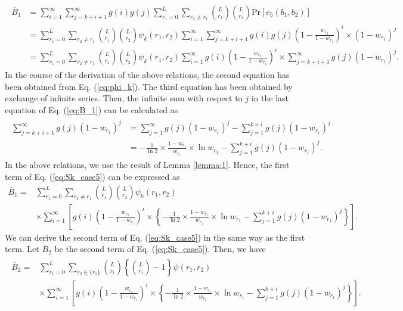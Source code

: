 \documentclass[dvipdfmx,english]{ampmt} %
\begin{document}
\begin{align}\begin{split}\label{eq:B_1}
  \overline{B}_1
  &=\sum_{i=1}^{\infty}\sum_{j=k+i+1}^{\infty} g(i)g(j) \sum_{r_1=0}^{L} \sum_{r_2 \neq r_1} \binom{L}{r_1}\binom{L}{r_2}\mathrm{Pr}[e_5(b_1,b_2)] \\
  &=\sum_{r_1=0}^{L} \sum_{r_2 \neq r_1} \binom{L}{r_1}\binom{L}{r_2}\psi_k(r_1,r_2)
  \sum_{i=1}^{\infty} \sum_{j=k+i+1}^{\infty} g(i)g(j) \left(1-\frac{w_{r_2}}{1-w_{r_1}} \right)^{i} \times (1-w_{r_1})^j \\
  &=\sum_{r_1=0}^{L} \sum_{r_2 \neq r_1} \binom{L}{r_1}\binom{L}{r_2}\psi_k(r_1,r_2)
  \sum_{i=1}^{\infty} g(i)\left(1-\frac{w_{r_2}}{1-w_{r_1}} \right)^{i} \times \sum_{j=k+i+1}^{\infty} g(j) (1-w_{r_1})^j.
\end{split}\end{align}
In the course of the derivation of the above relations, the second equation has been obtained from Eq. (\ref{eq:phi_k}). The third equation has been obtained by exchange of infinite series.
%
Then, the infinite sum with respect to $j$ in the last equation of Eq. (\ref{eq:B_1}) can be calculated as
\begin{align}\begin{split}
  \sum_{j=k+i+1}^{\infty} g(j) (1-w_{r_1})^j 
  &= \sum_{j=1}^{\infty} g(j)(1-w_{r_1})^{j} - \sum_{j=1}^{k+i} g(j)(1-w_{r_1})^{j} \\
  &= -\frac{1}{\ln 2} \times \frac{1-w_{r_1}}{w_{r_1}} \times \ln w_{r_1} - \sum_{j=1}^{k+i} g(j)(1-w_{r_1})^{j}.
\end{split}\end{align}
In the above relations, we use the result of Lemma \ref{lemma:1}.
Hence, the first term of Eq. (\ref{eq:Sk_case5}) can be expressed as
\begin{align}
  \overline{B}_1 
  =& \sum_{r_1=0}^{L} \sum_{r_2 \neq r_1} \binom{L}{r_1}\binom{L}{r_2}\psi_k(r_1,r_2)\\
  &\times\sum_{i=1}^{\infty} \left[ g(i) \left(1-\frac{w_{r_2}}{1-w_{r_1}} \right)^{i} \times \left\{ -\frac{1}{\ln 2} \times \frac{1-w_{r_1}}{w_{r_1}} \times \ln w_{r_1} - \sum_{j=1}^{k+i} g(j)(1-w_{r_1})^{j} \right\} \right].
\end{align}
We can derive the second term of Eq. (\ref{eq:Sk_case5}) in the same way as the first term. Let $\overline{B}_2$ be the second term of Eq. (\ref{eq:Sk_case5}). Then, we have
\begin{align}\begin{split}
  \overline{B}_2 =& \sum_{r_1=0}^{L} \sum_{r_2 \in \{r_1\}} \binom{L}{r_1}\left\{\binom{L}{r_1}-1\right\} \psi(r_1,r_2) \\
  &\times\sum_{i=1}^{\infty} \left[ g(i) \left(1-\frac{w_{r_2}}{1-w_{r_1}} \right)^{i} \times \left\{ -\frac{1}{\ln 2} \times \frac{1-w_{r_1}}{w_{r_1}} \times \ln w_{r_1} - \sum_{j=1}^{k+i} g(j)(1-w_{r_1})^{j} \right\} \right].
\end{split}\end{align}
\end{document}

